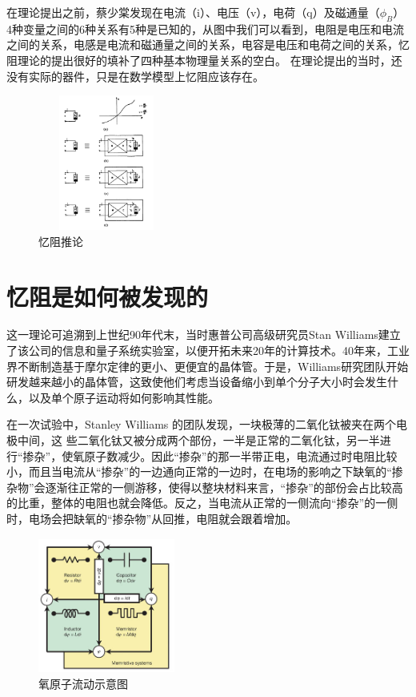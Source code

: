 \documentclass[UTF8]{article}
\begin{document}
在理论提出之前，蔡少棠发现在电流（i）、电压（v），电荷（q）及磁通量（$\phi_{B}$）4种变量之间的6种关系有5种是已知的，从图中我们可以看到，电阻是电压和电流之间的关系，电感是电流和磁通量之间的关系，电容是电压和电荷之间的关系，忆阻理论的提出很好的填补了四种基本物理量关系的空白。
在理论提出的当时，还没有实际的器件，只是在数学模型上忆阻应该存在。%

\begin{figure}[htbp]
\centering
\includegraphics[width=1.77in,height=1.75in]{pic/4}
\caption{忆阻推论}
\label{fig:4}
\end{figure}



\section{忆阻是如何被发现的}

这一理论可追溯到上世纪90年代末，当时惠普公司高级研究员Stan Williams建立了该公司的信息和量子系统实验室，以便开拓未来20年的计算技术。40年来，工业界不断制造基于摩尔定律的更小、更便宜的晶体管。于是，Williams研究团队开始研发越来越小的晶体管，这致使他们考虑当设备缩小到单个分子大小时会发生什么，以及单个原子运动将如何影响其性能。




在一次试验中，Stanley Williams 的团队发现，一块极薄的二氧化钛被夹在两个电极中间，这
些二氧化钛又被分成两个部份，一半是正常的二氧化钛，另一半进行“掺杂”，使氧原子数减少。因此“掺杂”的那一半带正电，电流通过时电阻比较小，而且当电流从“掺杂”的一边通向正常的一边时，在电场的影响之下缺氧的“掺杂物”会逐渐往正常的一侧游移，使得以整块材料来言，“掺杂”的部份会占比较高的比重，整体的电阻也就会降低。反之，当电流从正常的一侧流向“掺杂”的一侧时，电场会把缺氧的“掺杂物”从回推，电阻就会跟着增加。
\begin{figure}[htbp]
\centering
\includegraphics[width=1.77in,height=1.75in]{pic/memristor01.jpeg}

\caption{氧原子流动示意图}
\label{fig:graph}
\end{figure}
\end{document}

